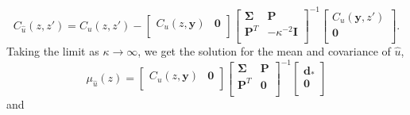 \documentclass[10pt,letter]{article}
\begin{document}
\begin{equation}\label{eq:PosteriorCov2}
C_{\hat{u}}(z,z') = C_u(z,z') - 
                    \left[\begin{array}{cc}
                          C_u(z,\bm{y}) & \bm{0} \\
                          \end{array}\right]
                    \left[\begin{array}{cc}
                          \bm{\Sigma} & \bm{P} \\
                          \bm{P}^T  & -\kappa^{-2} \bm{I} \\
                          \end{array}\right]^{-1}
                    \left[\begin{array}{c}
                          C_u(\bm{y},z') \\
                          \bm{0} \\
                          \end{array}\right].
\end{equation}
Taking the limit as $\kappa \to \infty$, we get the solution for the mean and covariance of $\hat{u}$,
 \begin{equation}\label{eq:PosteriorMean3}
\mu_{\hat{u}}(z) = \left[\begin{array}{cc}
                         C_u(z,\bm{y}) & \bm{0} \\
                         \end{array}\right]
                   \left[\begin{array}{cc}
                         \bm{\Sigma} & \bm{P} \\
                         \bm{P}^T  & \bm{0} \\
                         \end{array}\right]^{-1}
                   \left[\begin{array}{c}
                         \bm{d}_* \\
                         \bm{0} \\
                         \end{array}\right]
\end{equation}    
and
\end{document}
